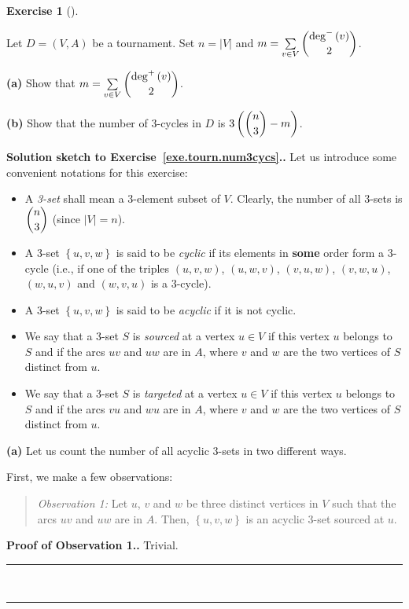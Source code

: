 \documentclass[numbers=enddot,12pt,final,onecolumn,notitlepage]{scrartcl}%
\newcounter{exer}
\theoremstyle{definition}
\newtheorem{exmp}[exer]{Exercise}
\newenvironment{exercise}[1][]
{\begin{exmp}[#1]\begin{leftbar}}
{\end{leftbar}\end{exmp}}
\newenvironment{statement}{\begin{quote}}{\end{quote}}
\newenvironment{proof}[1][Proof]{\noindent\textbf{#1.} }{\ \rule{0.5em}{0.5em}}
\let\sumnonlimits\sum
\renewcommand{\sum}{\sumnonlimits\limits}
\newcommand{\set}[1]{\left\{ #1 \right\}}
\newcommand{\abs}[1]{\left| #1 \right|}
\newcommand{\tup}[1]{\left( #1 \right)}
\begin{document}
\begin{exercise} \label{exe.tourn.num3cycs}
Let $D = \tup{V, A}$ be a tournament.
Set $n = \abs{V}$ and $m = \sum_{v \in V} \dbinom{\deg^-\tup{v}}{2}$.

\textbf{(a)} Show that $m = \sum_{v \in V} \dbinom{\deg^+\tup{v}}{2}$.

\textbf{(b)} Show that the number of $3$-cycles in $D$ is
$3\tup{\dbinom{n}{3} - m}$.
\end{exercise}

\begin{proof}[Solution sketch to Exercise~\ref{exe.tourn.num3cycs}.]
Let us introduce some convenient notations for this exercise:
\begin{itemize}
\item A \textit{3-set} shall mean a $3$-element subset of $V$.
Clearly, the number of all 3-sets is $\dbinom{n}{3}$ (since
$\abs{V} = n$).
\item A 3-set $\set{u, v, w}$ is said to be \textit{cyclic} if its
elements in \textbf{some} order form a $3$-cycle (i.e., if one of the
triples $\tup{u, v, w}$, $\tup{u, w, v}$, $\tup{v, u, w}$,
$\tup{v, w, u}$, $\tup{w, u, v}$ and $\tup{w, v, u}$ is a $3$-cycle).
\item A 3-set $\set{u, v, w}$ is said to be \textit{acyclic} if it is
not cyclic.
\item We say that a 3-set $S$ is \textit{sourced} at a vertex
$u \in V$ if this vertex $u$ belongs to $S$ and if the arcs $uv$ and
$uw$ are in $A$, where $v$ and $w$ are the two vertices of $S$
distinct from $u$.
\item We say that a 3-set $S$ is \textit{targeted} at a vertex
$u \in V$ if this vertex $u$ belongs to $S$ and if the arcs $vu$ and
$wu$ are in $A$, where $v$ and $w$ are the two vertices of $S$
distinct from $u$.
\end{itemize}

\textbf{(a)} Let us count the number of all acyclic 3-sets in two
different ways.

First, we make a few observations:

\begin{statement}
\textit{Observation 1:} Let $u$, $v$ and $w$ be three distinct
vertices in $V$ such that the arcs $uv$ and $uw$ are in $A$.
Then, $\set{u, v, w}$ is an acyclic 3-set sourced at $u$.
\end{statement}
\begin{proof}[Proof of Observation 1.]
Trivial.
\end{proof}


\end{proof}
\end{document}
